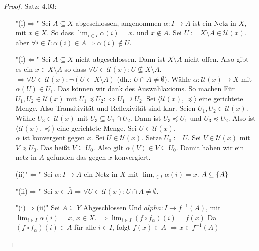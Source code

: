 \begin{proof}{Satz: 4.03:}\\
    \begin{itemize}
        \item["(i)$\Rightarrow$"]
        Sei $A \subseteq X$ abgeschlossen, 
        angenommen $\alpha : I \to A$ ist ein Netz in $X$, mit $x \in X$.
        So dass $\lim_{i \in I} \alpha(i) = x$. und $x \notin A$.
        Sei $U := X \setminus A \in \mathcal{U}(x)$.
        aber $\forall i \in I : \alpha(i) \in A \Rightarrow \alpha(i) \notin U$.
        \item["(i)$\Leftarrow$"]
        Sei $A \subseteq X$ nicht abgeschlossen. 
        Dann ist $X \setminus A$ nicht offen. 
        Also gibt es ein $x \in X \setminus A$ so dass 
        $\forall U \in \mathcal{U}(x) : U \not\subseteq X \setminus A$.
        $\Rightarrow \forall U \in \mathscr{U}(x) : \neg (U \subset X \setminus A)$
        (dh.: $U \cap A \neq \emptyset$).
        Wähle $\alpha : \mathscr{U}(x) \to X$ mit $\alpha(U) \in U_1 $.
        Das können wir dank des Auswahlaxioms. So machen
        Für $U_1, U_2 \in \mathscr{U}(x)$ mit $U_1 \preceq U_2 : \Leftrightarrow U_1 \supseteq U_2$.
        Sei $\langle \mathscr{U}(x), \preceq \rangle$ eine gerichtete Menge.
        Also Transitivität und Reflexivität sind klar.
        Seien $U_1, U_2 \in \mathscr{U}(x)$.
        Wähle $U_3 \in \mathscr{U}(x)$ mit $U_3 \subseteq U_1 \cap U_2$.
        Dann ist $U_3 \preceq U_1$ und $U_3 \preceq U_2$.
        Also ist $\langle \mathscr{U}(x), \preceq \rangle$ eine gerichtete Menge.
        Sei $U \in \mathscr{U}(x)$.\\
        $\alpha$ ist konvergent gegen $x$.
        Sei $U \in \mathscr{U}(x)$. Setze $U_0 := U$.
        Sei $V \in \mathscr{U}(x)$ mit $V \preceq U_0$.
        Das heißt $V \subseteq U_0$.
        Also gilt $\alpha(V) \in V \subseteq U_0$.
        Damit haben wir ein netz in $A$ gefunden das gegen $x$ konvergiert.
        \item[(ii)"$\Leftarrow$"]
        Sei $\alpha : I \to A$ ein Netz in $X$ mit $\lim_{i \in I} \alpha(i) = x$.
        $A \subseteq \bar \{A\}$
        \item["(ii)$\Rightarrow$"]
        Sei $x \in  \bar{A} \Rightarrow 
        \forall U \in \mathcal{U}(x) : U \cap A \neq \emptyset$.
        \item["(i)$\Rightarrow$(ii)"]
        Sei $A \subseteq Y$ Abgeschlossen 
        Und $alpha : I \to f^{-1}(A)$, 
        mit $\lim_{i \in I} \alpha(i) = x$, $x \in X$.
        $\Rightarrow \lim_{i \in I} (f \circ f_\alpha)(i) = f(x)$
        Da $(f \circ f_\alpha)(i) \in A$ für alle $i \in I$, folgt  
        $f(x) \in \overline{A}$
        $\Rightarrow  x \in f^{-1}(A)$
        \end{itemize}
        
\end{proof}
